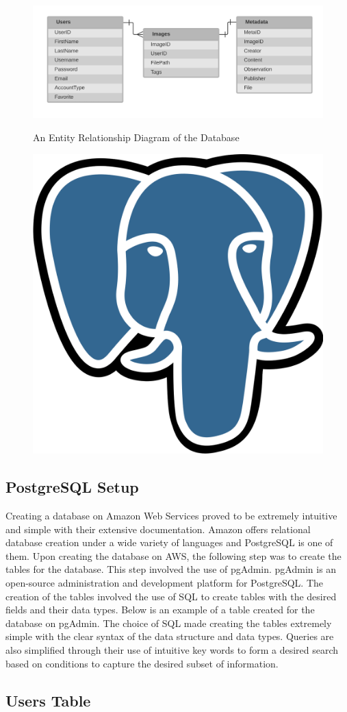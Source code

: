 \documentclass[12pt]{report}
\begin{document}
\begin{figure}[h]
	\centering
	\caption{An Entity Relationship Diagram of the Database}
	\includegraphics[width=\linewidth]{database}
	\label{fig:ERD}
\end{figure}

\begin{figure}[h]
	\centering
	\includegraphics[width=0.251\linewidth]{postgresql}
\end{figure}

\subsection*{PostgreSQL Setup}

Creating a database on Amazon Web Services proved to be extremely intuitive and simple with their extensive documentation.  Amazon offers relational database creation under a wide variety of languages and PostgreSQL is one of them.  Upon creating the database on AWS, the following step was to create the tables for the database.  This step involved the use of pgAdmin.  pgAdmin is an open-source administration and development platform for PostgreSQL.  The creation of the tables involved the use of SQL to create tables with the desired fields and their data types.  Below is an example of a table created for the database on pgAdmin.  The choice of SQL made creating the tables extremely simple with the clear syntax of the data structure and data types.  Queries are also simplified through their use of intuitive key words to form a desired search based on conditions to capture the desired subset of information.

\subsection*{Users Table}
\end{document}
